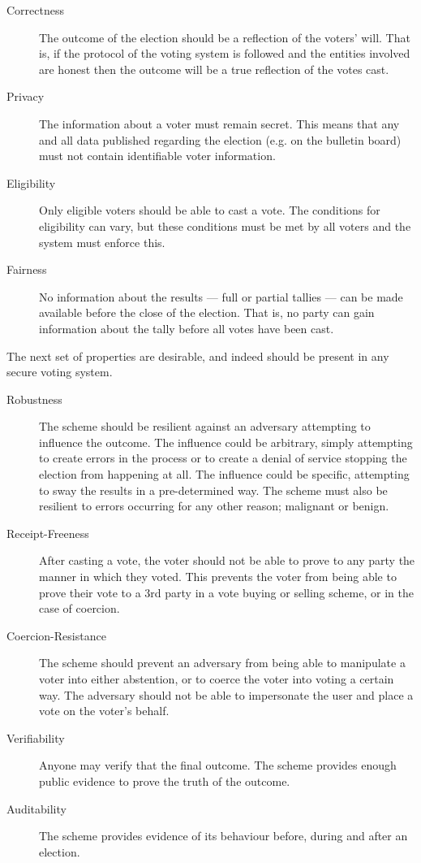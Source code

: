 \begin{description}
    \item[Correctness] The outcome of the election should be a reflection of the voters' will. That is, if the protocol of the voting system is followed and the entities involved are honest then the outcome will be a true reflection of the votes cast.
    \item[Privacy] The information about a voter must remain secret. This means that any and all data published regarding the election (e.g. on the bulletin board) must not contain identifiable voter information.
    \item[Eligibility] Only eligible voters should be able to cast a vote. The conditions for eligibility can vary, but these conditions must be met by all voters and the system must enforce this.
    \item[Fairness] No information about the results --- full or partial tallies --- can be made available before the close of the election. That is, no party can gain information about the tally before all votes have been cast.
\end{description}

The next set of properties are desirable, and indeed should be present in any secure voting system.

\begin{description}
    \item[Robustness] The scheme should be resilient against an adversary attempting to influence the outcome. The influence could be arbitrary, simply attempting to create errors in the process or to create a denial of service stopping the election from happening at all. The influence could be specific, attempting to sway the results in a pre-determined way. The scheme must also be resilient to errors occurring for any other reason; malignant or benign.
    \item[Receipt-Freeness] After casting a vote, the voter should not be able to prove to any party the manner in which they voted. This prevents the voter from being able to prove their vote to a 3rd party in a vote buying or selling scheme, or in the case of coercion.
    \item[Coercion-Resistance] The scheme should prevent an adversary from being able to manipulate a voter into either abstention, or to coerce the voter into voting a certain way. The adversary should not be able to impersonate the user and place a vote on the voter's behalf.
    \item[Verifiability] Anyone may verify that the final outcome. The scheme provides enough public evidence to prove the truth of the outcome.
    \item[Auditability] The scheme provides evidence of its behaviour before, during and after an election.
\end{description}

